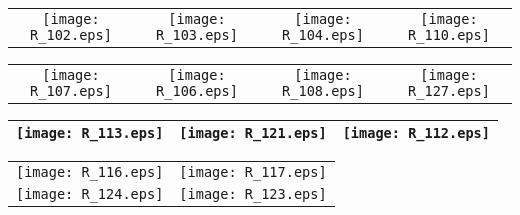 \newpage


\begin{table}[ht!]
\centering
\begin{tabular}{cccc}
\texttt{[image: R\_102.eps]} & \texttt{[image: R\_103.eps]} & \texttt{[image: R\_104.eps]} &
\texttt{[image: R\_110.eps]}
\end{tabular}
\end{table}

\begin{table}[ht!]
\centering
\begin{tabular}{cccc}
\texttt{[image: R\_107.eps]} &
\texttt{[image: R\_106.eps]} & 	\texttt{[image: R\_108.eps]} & 	\texttt{[image: R\_127.eps]} \\
\end{tabular}
\end{table}

\begin{table}[ht!]
\centering
\begin{tabular}{ccc}
\texttt{[image: R\_113.eps]} & \texttt{[image: R\_121.eps]} & \texttt{[image: R\_112.eps]} \\ \bottomrule
\end{tabular}
\end{table}

\begin{table}[ht!]
\centering
\begin{tabular}{cc}
\toprule
\texttt{[image: R\_116.eps]} & \texttt{[image: R\_117.eps]} \\\texttt{[image: R\_124.eps]} & \texttt{[image: R\_123.eps]} \\ \bottomrule
\end{tabular}
\end{table}